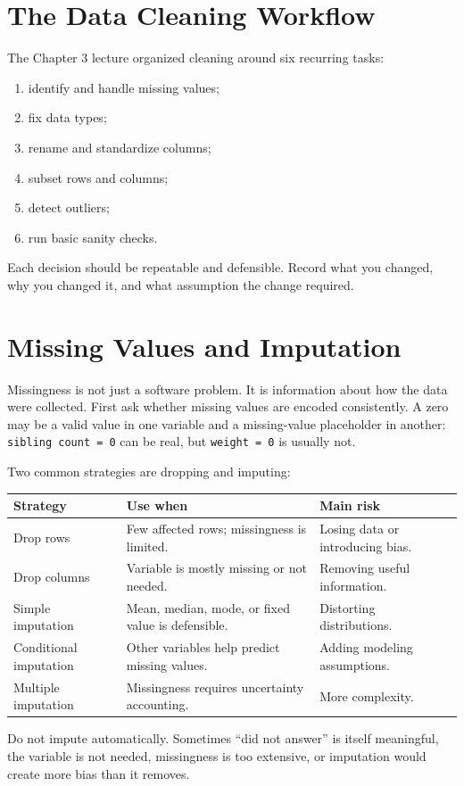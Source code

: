 {\section{The Data Cleaning Workflow}

The Chapter 3 lecture organized cleaning around six recurring tasks:
\begin{enumerate}
  \item identify and handle missing values;
  \item fix data types;
  \item rename and standardize columns;
  \item subset rows and columns;
  \item detect outliers;
  \item run basic sanity checks.
\end{enumerate}
Each decision should be repeatable and defensible.  Record what you changed, why you changed it, and what assumption the change required.

\section{Missing Values and Imputation}

Missingness is not just a software problem.  It is information about how the data were collected.  First ask whether missing values are encoded consistently.  A zero may be a valid value in one variable and a missing-value placeholder in another: \texttt{sibling count = 0} can be real, but \texttt{weight = 0} is usually not.

Two common strategies are dropping and imputing:
\begin{center}
\begin{tabular}{p{}p{}p{}}
\toprule
\textbf{Strategy} & \textbf{Use when} & \textbf{Main risk} \\
\midrule
Drop rows & Few affected rows; missingness is limited. & Losing data or introducing bias. \\
Drop columns & Variable is mostly missing or not needed. & Removing useful information. \\
Simple imputation & Mean, median, mode, or fixed value is defensible. & Distorting distributions. \\
Conditional imputation & Other variables help predict missing values. & Adding modeling assumptions. \\
Multiple imputation & Missingness requires uncertainty accounting. & More complexity. \\
\bottomrule
\end{tabular}
\end{center}
Do not impute automatically.  Sometimes ``did not answer'' is itself meaningful, the variable is not needed, missingness is too extensive, or imputation would create more bias than it removes.

}
